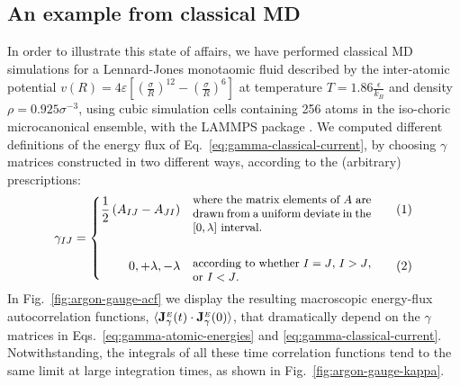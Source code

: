 \subsection{An example from classical MD}
In order to illustrate this state of affairs, we have performed classical MD simulations for a Lennard-Jones monotaomic fluid described by the inter-atomic potential $v(R) = 4\varepsilon \left[ \left( \frac{\sigma}{R}\right)^{12} - \left(\frac{\sigma}{R} \right)^{6} \right]$ at temperature $T=1.86 \frac{\epsilon}{k_B}$ and density $\rho=0.925 \sigma^{-3}$, using cubic simulation cells containing 256 atoms in the iso-choric microcanonical ensemble, with the LAMMPS package \cite{LAMMPS1995}. 
We computed different definitions of the energy flux of Eq.~\eqref{eq:gamma-classical-current}, by choosing $\gamma$ matrices constructed in two different ways, according to the (arbitrary) prescriptions:
\begin{equation}
\setbox0=\vbox{\hsize=50mm \small\noindent where the matrix
      elements of $A$ are drawn from a uniform deviate  in the
      $[0,\lambda]$ interval.}
\setbox1 \vbox{\hsize=50mm \small\noindent according to whether $I=J$,
  $I>J$, or $I<J$.}
\gamma_{IJ}= \left \{
  \begin{alignedat}{2}
    \frac{1}{2} \left(A_{IJ}-A_{JI}\right ) & \quad\raise -.5\ht0
    \box0 && \qquad (1) \\
\\
    0, +\lambda, -\lambda & \quad\raise -0.5\ht1 \box1 && \qquad (2) \\
  \end{alignedat} \right .
\label{eq:gamma-definitions}
\end{equation}
In Fig.~\ref{fig:argon-gauge-acf} we display the resulting macroscopic energy-flux autocorrelation functions, $\langle \mathbf{J}_{\gamma}^{{\scriptscriptstyle E}}(t) \cdot\mathbf{J}_{\gamma}^{{\scriptscriptstyle E}}(0)\rangle$, that dramatically depend on the $\gamma$ matrices in Eqs.~\eqref{eq:gamma-atomic-energies} and \eqref{eq:gamma-classical-current}.  Notwithstanding, the integrals of all these time correlation functions tend to the same limit at large integration times, as shown in Fig.~\ref{fig:argon-gauge-kappa}.


